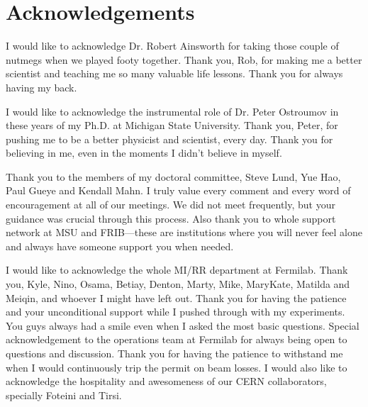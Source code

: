 \documentclass[]{msu-thesis}
\begin{document}
\clearpage

\makecopyrightpage 

%
%
\clearpage
\chapter*{Acknowledgements}
\DoubleSpacing %
I would like to acknowledge Dr. Robert Ainsworth for taking those couple of nutmegs when we played footy together. Thank you, Rob, for making me a better scientist and teaching me so many valuable life lessons. Thank you for always having my back.

I would like to acknowledge the instrumental role of Dr. Peter Ostroumov in these years of my Ph.D. at Michigan State University. Thank you, Peter, for pushing me to be a better physicist and scientist, every day. Thank you for believing in me, even in the moments I didn't believe in myself.

Thank you to the members of my doctoral committee, Steve Lund, Yue Hao, Paul Gueye and Kendall Mahn. I truly value every comment and every word of encouragement at all of our meetings. We did not meet frequently, but your guidance was crucial through this process. Also thank you to whole support network at MSU and FRIB---these are institutions where you will never feel alone and always have someone support you when needed.

I would like to acknowledge the whole MI/RR department at Fermilab. Thank you, Kyle, Nino, Osama, Betiay, Denton, Marty, Mike, MaryKate, Matilda and Meiqin, and whoever I might have left out. Thank you for having the patience and your unconditional support while I pushed through with my experiments. You guys always had a smile even when I asked the most basic questions. Special acknowledgement to the operations team at Fermilab for always being open to questions and discussion. Thank you for having the patience to withstand me when I would continuously trip the permit on beam losses. I would also like to acknowledge the hospitality and awesomeness of our CERN collaborators, specially Foteini and Tirsi. 
\end{document}
